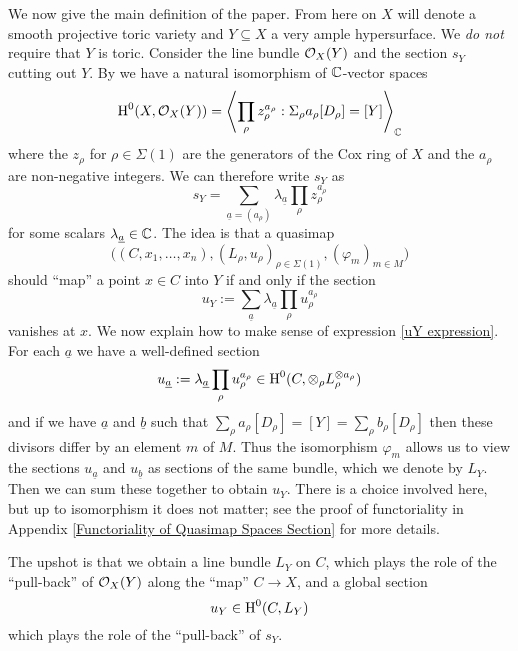 We now give the main definition of the paper. From here on $X$ will denote a smooth projective toric variety and $Y \subseteq X$ a very ample hypersurface. We \emph{do not} require that $Y$ is toric.
Consider the line bundle $\mathcal{O}_X(Y)$ and the section $s_Y$ cutting out $Y$. By \cite{CoxRing} we have a natural isomorphism of $\mathbb{C}$-vector spaces
\begin{equation*} \operatorname{H}^0(X,\mathcal{O}_X(Y)) = \left\langle \prod_{\rho} z_\rho^{a_\rho} : \Sigma_\rho a_\rho [D_\rho] = [Y] \right\rangle_{\mathbb{C}} \end{equation*}
where the $z_\rho$ for $\rho \in \Sigma(1)$ are the generators of the Cox ring of $X$ and the $a_\rho$ are non-negative integers. We can therefore write $s_Y$ as
\begin{equation*} s_Y = \sum_{\underline{a}=(a_\rho)} \lambda_{\underline{a}} \prod_\rho z_\rho^{a_\rho} \end{equation*}
for some scalars $\lambda_{\underline{a}} \in \mathbb{C}$. The idea is that a quasimap
\begin{equation*} \big((C,x_1,\ldots,x_n), (L_\rho,u_\rho)_{\rho \in \Sigma(1)}, (\varphi_m)_{m \in M}\big) \end{equation*}
should ``map'' a point $x \in C$ into $Y$ if and only if the section
\begin{equation} \label{uY expression} u_Y := \sum_{\underline{a}} \lambda_{\underline{a}} \prod_\rho u_\rho^{a_\rho} \end{equation}
vanishes at $x$. We now explain how to make sense of expression \eqref{uY expression}. For each $\underline{a}$ we have a well-defined section
\begin{equation*} u_{\underline{a}} := \lambda_{\underline{a}} \prod_\rho u_\rho^{a_\rho} \in \operatorname{H}^0(C,\otimes_\rho L_\rho^{\otimes a_\rho}) \end{equation*}
and if we have $\underline{a}$ and $\underline{b}$ such that $\sum_\rho a_\rho [D_\rho] = [Y] = \sum_\rho b_\rho [D_\rho]$ then these divisors differ by an element $m$ of $M$. Thus the isomorphism $\varphi_m$ allows us to view the sections $u_{\underline{a}}$ and $u_{\underline{b}}$ as sections of the same bundle, which we denote by $L_Y$. Then we can sum these together to obtain $u_Y$. There is a choice involved here, but up to isomorphism it does not matter; see the proof of functoriality in Appendix \ref{Functoriality of Quasimap Spaces Section} for more details.

The upshot is that we obtain a line bundle $L_Y$ on $C$, which plays the role of the ``pull-back'' of $\mathcal{O}_X(Y)$ along the ``map'' $C \to X$, and a global section
\begin{equation*} u_Y \in \operatorname{H}^0(C,L_Y) \end{equation*}
which plays the role of the ``pull-back'' of $s_Y$.

